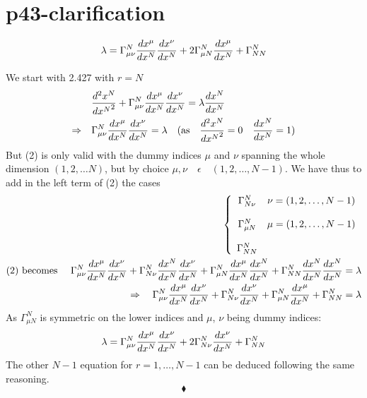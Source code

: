 \section{p43-clarification }
\begin{tcolorbox}
$$\lambda = \Gamma^N_{\mu \nu}\dv{x^{\mu}}{x^N} \dv{x^{\nu}}{x^N} + 2\Gamma^N_{\mu N}\dv{x^{\mu}}{x^N}+\Gamma^N_{N N} $$
\end{tcolorbox}
We start with 2.427 with $r=N$
\begin{align}
\ &\dv[2]{x^N}{{x^{N}}} + \Gamma^N_{\mu\nu}\dv{x^{\mu}}{x^N} \dv{x^{\nu}}{x^N} = \lambda \dv{x^N}{x^N}\\
\Rightarrow\quad &\Gamma^N_{\mu\nu}\dv{x^{\mu}}{x^N} \dv{x^{\nu}}{x^N} = \lambda \quad \text{(as}\quad \dv[2]{x^N}{{x^{N}}} = 0 \quad \dv{x^N}{x^N} = 1 \text{)}
\end{align}
But (2) is only valid with the dummy indices $\mu$ and $\nu$ spanning the whole dimension $(1,2,\dots N)$, but by choice $\mu,\nu \quad \epsilon \quad (1,2, \dots, N-1)$. We have thus to add in the left term of (2) the cases
\begin{align}
\left\{ \begin{array}{cc}
\Gamma^N_{N\nu}& \nu = (1,2,\dots ,N-1)\\\\
\Gamma^N_{\mu N}& \mu = (1,2,\dots ,N-1)\\\\
\Gamma^N_{NN}& \\
\end{array} \right.\\
\text{(2) becomes } \quad \Gamma^N_{\mu\nu}\dv{x^{\mu}}{x^N} \dv{x^{\nu}}{x^N} + \Gamma^N_{N \nu}\dv{x^N}{x^N} \dv{x^{\nu}}{x^N} + \Gamma^N_{\mu N}\dv{x^{\mu}}{x^N} \dv{x^{N}}{x^N} + \Gamma^N_{NN}\dv{x^{N}}{x^N} \dv{x^{N}}{x^N}= \lambda\\
\Rightarrow   \quad \Gamma^N_{\mu\nu}\dv{x^{\mu}}{x^N} \dv{x^{\nu}}{x^N} + \Gamma^N_{N \nu}\dv{x^{\nu}}{x^N} + \Gamma^N_{\mu N}\dv{x^{\mu}}{x^N}+ \Gamma^N_{NN} = \lambda
\end{align}
As $\Gamma^N_{\mu N}$ is symmetric on the lower indices and $\mu$, $\nu$ being dummy indices:
\begin{align}
\lambda  =\Gamma^N_{\mu\nu}\dv{x^{\mu}}{x^N} \dv{x^{\nu}}{x^N} + 2\Gamma^N_{N \nu}\dv{x^{\nu}}{x^N} +\Gamma^N_{NN}
\end{align}
The other $N-1$ equation for $r= 1,\dots, N-1$ can be deduced following the same reasoning.
$$\blacklozenge$$
\newpage


